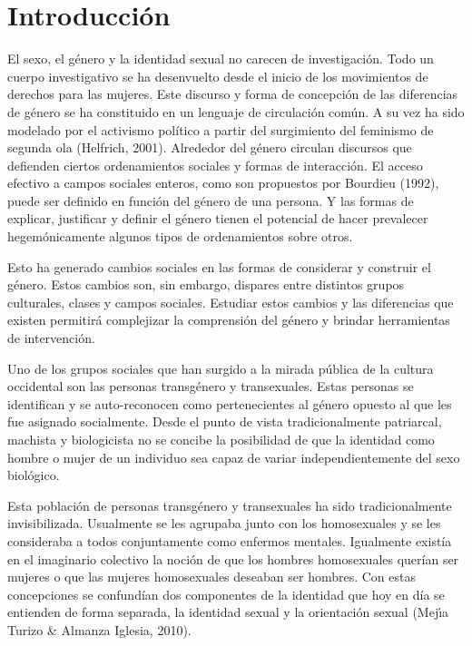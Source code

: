 \chapter{Introducción}\label{ch:intro}

El sexo, el género y la identidad sexual no carecen de investigación.
Todo un cuerpo investigativo se ha desenvuelto desde el inicio de los
movimientos de derechos para las mujeres.
Este discurso y forma de concepción de las diferencias de género se ha
constituido en un lenguaje de circulación común.
A su vez ha sido modelado por el activismo político a partir del surgimiento
del feminismo de segunda ola (Helfrich, 2001).
Alrededor del género circulan discursos que defienden ciertos ordenamientos
sociales y formas de interacción.
El acceso efectivo a campos sociales enteros, como son propuestos por
Bourdieu (1992), puede ser definido en función del género de una persona.
Y las formas de explicar, justificar y definir el género tienen el potencial
de hacer prevalecer hegemónicamente algunos tipos de ordenamientos sobre otros.

Esto ha generado cambios sociales en las formas de considerar y construir el
género.
Estos cambios son, sin embargo, dispares entre distintos grupos culturales,
clases y campos sociales.
Estudiar estos cambios y las diferencias que existen permitirá complejizar
la comprensión del género y brindar herramientas de intervención.

Uno de los grupos sociales que han surgido a la mirada pública de la cultura
occidental son las personas transgénero y transexuales.
Estas personas se identifican y se auto-reconocen como pertenecientes al
género opuesto al que les fue asignado socialmente.
Desde el punto de vista tradicionalmente patriarcal, machista y biologicista
no se concibe la posibilidad de que la identidad como hombre o mujer de un
individuo sea capaz de variar independientemente del sexo biológico.

Esta población de personas transgénero y transexuales ha sido
tradicionalmente invisibilizada.
Usualmente se les agrupaba junto con los homosexuales y se les consideraba a
todos conjuntamente como enfermos mentales.
Igualmente existía en el imaginario colectivo la noción de que los hombres
homosexuales querían ser mujeres o que las mujeres homosexuales deseaban ser
hombres.
Con estas concepciones se confundían dos componentes de la identidad que hoy
en día se entienden de forma separada, la identidad sexual y la orientación
sexual (Mejı́a Turizo \& Almanza Iglesia, 2010).

